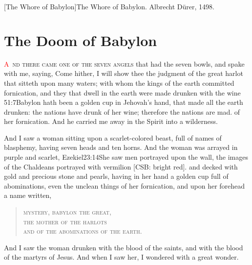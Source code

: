 [The Whore of Babylon]{The Whore of Babylon. Albrecht Dürer, 1498.}

\chapter{The Doom of Babylon}
\lettrine[lines=3,slope=0.5em]{\textcolor{red}{A}}{\ nd there came one of the seven angels} that had the seven bowls, and spake with me, saying, Come hither, I will show thee the judgment of the great harlot that sitteth upon many waters;%
with whom the kings of the earth committed fornication,%
and they that dwell in the earth were made drunken with the wine%
					  {51:7}{Babylon hath been a golden cup in Jehovah’s hand, that made all the earth drunken: the nations have drunk of her wine; therefore the nations are mad.} %
of her fornication.%
And he carried me away in the Spirit into a wilderness. 

And I saw a woman sitting upon a scarlet-colored beast, full of names of blasphemy, having seven heads and ten horns. 
And the woman was arrayed in purple and scarlet,%
				{Ezekiel}{23:14}{She saw men portrayed upon the wall, the images of the Chaldeans portrayed with vermilion [CSB: bright red].} %
and decked with gold and precious stone and pearls,%
having in her hand a golden cup full of abominations, even the unclean things of her fornication, 
and upon her forehead a name written,%
\begin{verse}
\textsc{%
mystery, babylon the great,\\
the mother of the harlots\\
and of the abominations of the earth.%
}
\end{verse}
And I saw the woman drunken with the blood of the saints, and with the blood of the martyrs of Jesus. And when I saw her, I wondered with a great wonder. 

